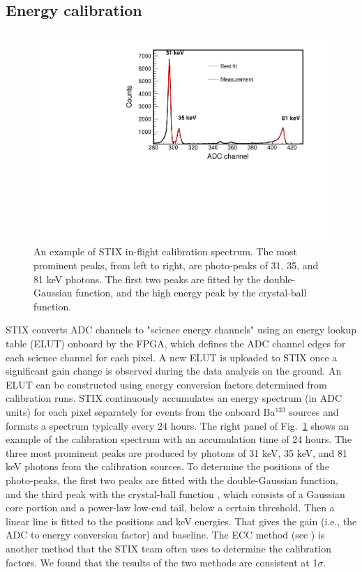 \documentclass[referee]{preaa} %
\begin{document}
\subsection{Energy calibration}
\begin{figure}
 \centering
  \includegraphics[width=0.8\linewidth]{figures/cal-fit.pdf}
  \caption{An example of STIX in-flight calibration spectrum.
  The most prominent peaks, from left to right, are photo-peaks of 31, 35, and 81 keV
  photons. The first two peaks are fitted by the double-Gaussian function, and the high energy peak by  
  the crystal-ball function. }
    \label{fig:cal-fit}
\end{figure}
STIX converts ADC channels to "science energy channels" using an energy lookup table (ELUT) 
onboard by the FPGA, which defines the ADC channel edges  for each science channel for each pixel. 
A new ELUT is uploaded to STIX once a significant gain change is observed during the data analysis on the ground.  An ELUT can be constructed using energy conversion factors determined from calibration runs. 
STIX continuously accumulates an  energy spectrum (in ADC units) for each pixel separately for events from the onboard Ba$^{133}$ sources and formats a  spectrum typically every 24 hours. 
The right panel of Fig.~\ref{fig:cal-fit} shows an example of the calibration spectrum with an accumulation time of 24 hours.  The three most prominent peaks are produced by photons of 31 keV, 35 keV, and 81 keV photons from the calibration sources. To determine the positions of the photo-peaks, the first two peaks are fitted with the double-Gaussian function, and the third peak with the crystal-ball function \citep{crsystallball},
which consists of a Gaussian core portion 
and a power-law low-end tail, below a certain threshold.
Then a linear line is fitted to the positions and keV energies.  That gives the gain (i.e., the ADC to energy conversion factor) and baseline.
The ECC method (see \citet{ecc,ecc2}) is another method that the STIX team often uses to determine the calibration factors.  We found that the results of the two methods are consistent at 1$\sigma$.
\end{document}
